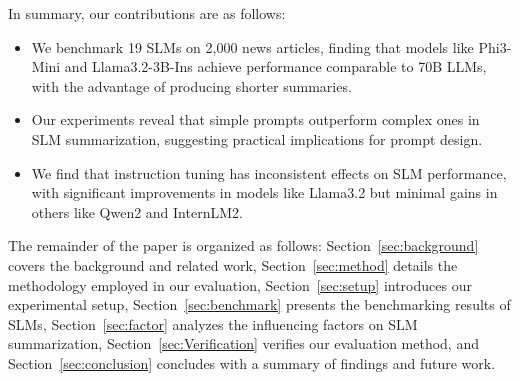 In summary, our contributions are as follows: 
\begin{itemize}
  
    \item We benchmark 19 SLMs on 2,000 news articles, finding that models like Phi3-Mini and Llama3.2-3B-Ins achieve performance comparable to 70B LLMs, with the advantage of producing shorter summaries. 
    
    \item Our experiments reveal that simple prompts outperform complex ones in SLM summarization, suggesting practical implications for prompt design.

    \item We find that instruction tuning has inconsistent effects on SLM performance, with significant improvements in models like Llama3.2 but minimal gains in others like Qwen2 and InternLM2.
    
\end{itemize}

The remainder of the paper is organized as follows: Section~\ref{sec:background} covers the background and related work, Section~\ref{sec:method} details the methodology employed in our evaluation, Section~\ref{sec:setup} introduces our experimental setup, Section~\ref{sec:benchmark} presents the benchmarking results of SLMs, Section~\ref{sec:factor} analyzes the influencing factors on SLM summarization, Section~\ref{sec:Verification} verifies our evaluation method, and Section~\ref{sec:conclusion} concludes with a summary of findings and future work.










